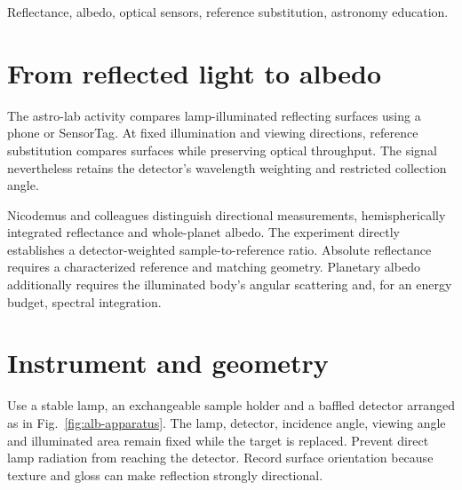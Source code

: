 \begin{abstract}
Surface brightness becomes a reflectance measurement only after illumination, viewing geometry and detector weighting have been specified. In example phone and SensorTag records, dark-subtracted grey-to-reference ratios are 0.364 and 0.368; black-to-reference ratios are approximately 0.042 and 0.041. The full-record extrema contrast instead approaches 100\% because the sequence includes a covered sensor. Calibrated reflectance requires a characterized reference and matched geometry, while a planetary albedo additionally depends on angular scattering and spectral integration.
\end{abstract}
\begin{IEEEkeywords}
Reflectance, albedo, optical sensors, reference substitution, astronomy education.
\end{IEEEkeywords}

\section{From reflected light to albedo}
The astro-lab activity compares lamp-illuminated reflecting surfaces using a phone or SensorTag\cite{astrolab2022}. At fixed illumination and viewing directions, reference substitution compares surfaces while preserving optical throughput. The signal nevertheless retains the detector's wavelength weighting and restricted collection angle.

Nicodemus and colleagues distinguish directional measurements, hemispherically integrated reflectance and whole-planet albedo\cite{nicodemus1977}. The experiment directly establishes a detector-weighted sample-to-reference ratio. Absolute reflectance requires a characterized reference and matching geometry. Planetary albedo additionally requires the illuminated body's angular scattering and, for an energy budget, spectral integration.

\section{Instrument and geometry}
Use a stable lamp, an exchangeable sample holder and a baffled detector arranged as in Fig.~\ref{fig:alb-apparatus}. The lamp, detector, incidence angle, viewing angle and illuminated area remain fixed while the target is replaced. Prevent direct lamp radiation from reaching the detector. Record surface orientation because texture and gloss can make reflection strongly directional.

